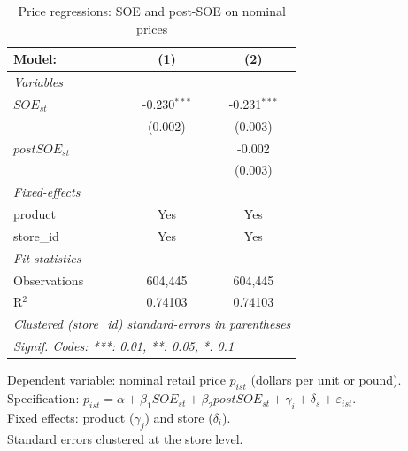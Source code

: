 
\begin{table}[htbp]
   \caption{\label{tab:price_reg} Price regressions: SOE and post-SOE on nominal prices}
   \centering
   \begin{tabular}{lcc}
      \tabularnewline \midrule \midrule
      Model:         & (1)            & (2)\\  
      \midrule
      \emph{Variables}\\
      $SOE_{st}$     & -0.230$^{***}$ & -0.231$^{***}$\\   
                     & (0.002)        & (0.003)\\   
      $postSOE_{st}$ &                & -0.002\\   
                     &                & (0.003)\\   
      \midrule
      \emph{Fixed-effects}\\
      product        & Yes            & Yes\\  
      store\_id      & Yes            & Yes\\  
      \midrule
      \emph{Fit statistics}\\
      Observations   & 604,445        & 604,445\\  
      R$^2$          & 0.74103        & 0.74103\\  
      \midrule \midrule
      \multicolumn{3}{l}{\emph{Clustered (store\_id) standard-errors in parentheses}}\\
      \multicolumn{3}{l}{\emph{Signif. Codes: ***: 0.01, **: 0.05, *: 0.1}}\\
   \end{tabular}
   
   \par \raggedright 
   Dependent variable: nominal retail price $p_{ist}$ (dollars per unit or pound).\\
   Specification: $p_{ist} = \alpha + \beta_1 SOE_{st} + \beta_2 postSOE_{st} + \gamma_i + \delta_s + \varepsilon_{ist}$.\\
   Fixed effects: product ($\gamma_j$) and store ($\delta_i$).\\
   Standard errors clustered at the store level.
\end{table}


